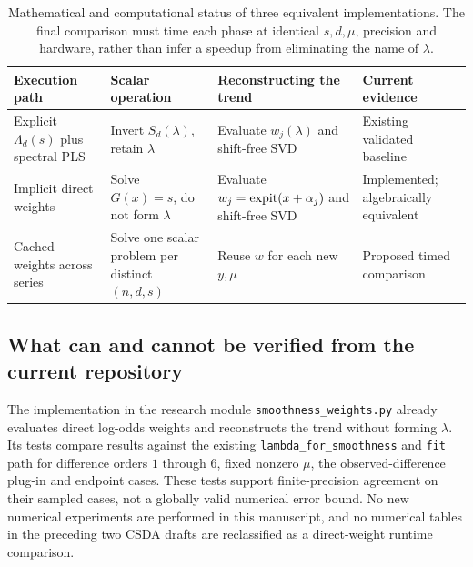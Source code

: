 \begin{table}[t]
\caption{Mathematical and computational status of three equivalent implementations. The final comparison must time each phase at identical $s,d,\mu$, precision and hardware, rather than infer a speedup from eliminating the name of $\lambda$.}
\label{tab:comparison}\centering
\begin{tabular}{@{}p{}p{}p{}p{}@{}}
\toprule
Execution path & Scalar operation & Reconstructing the trend & Current evidence\\
\midrule
Explicit $\Lambda_d(s)$ plus spectral PLS
& Invert $S_d(\lambda)$, retain $\lambda$ & Evaluate $w_j(\lambda)$ and shift-free SVD & Existing validated baseline\\
Implicit direct weights
& Solve $G(x)=s$, do not form $\lambda$ & Evaluate $w_j=\operatorname{expit}(x+\alpha_j)$ and shift-free SVD & Implemented; algebraically equivalent\\
Cached weights across series
& Solve one scalar problem per distinct $(n,d,s)$ & Reuse $w$ for each new $y,\mu$ & Proposed timed comparison\\
\bottomrule
\end{tabular}
\end{table}

\subsection{What can and cannot be verified from the current repository}
The implementation in the research module
\texttt{smoothness\_weights.py} already evaluates direct log-odds weights and reconstructs the trend
without forming $\lambda$. Its tests compare results against the
existing \texttt{lambda\_for\_smoothness} and
\texttt{fit} path for
difference orders $1$ through $6$, fixed nonzero $\mu$,
the observed-difference plug-in and endpoint cases.
These tests support finite-precision agreement on their sampled cases,
not a globally valid numerical error bound.
No new numerical experiments are performed in this manuscript,
and no numerical tables in the preceding two CSDA drafts are
reclassified as a direct-weight runtime comparison.
